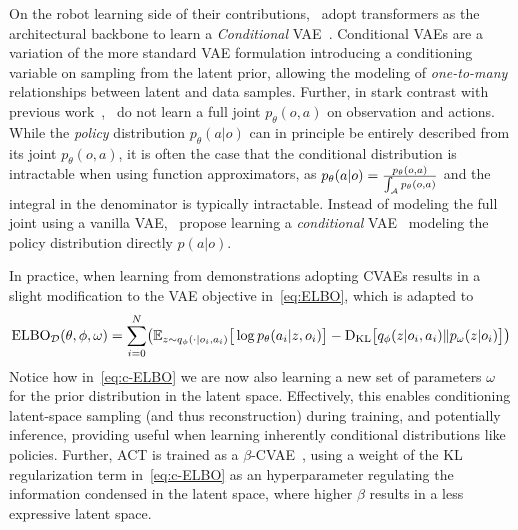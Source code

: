 On the robot learning side of their contributions,~\citet{zhaoLearningFineGrainedBimanual2023} adopt transformers as the architectural backbone to learn a \emph{Conditional} VAE~\citep{sohnLearningStructuredOutput2015}. 
Conditional VAEs are a variation of the more standard VAE formulation introducing a conditioning variable on sampling from the latent prior, allowing the modeling of \emph{one-to-many} relationships between latent and data samples.
Further, in stark contrast with previous work~\citep{florenceImplicitBehavioralCloning2022,jannerPlanningDiffusionFlexible2022},~\citet{zhaoLearningFineGrainedBimanual2023} do not learn a full joint \( p_\theta(o,a) \) on observation and actions.
While the \emph{policy} distribution \( p_\theta(a \vert o) \) can in principle be entirely described from its joint \( p_\theta(o,a) \), it is often the case that the conditional distribution is intractable when using function approximators, as \( p_\theta(a \vert o) = \tfrac{p_\theta(o,a)}{\int_\mathcal A p_\theta(o,a)} \) and the integral in the denominator is typically intractable.
Instead of modeling the full joint using a vanilla VAE,~\citet{zhaoLearningFineGrainedBimanual2023} propose learning a \emph{conditional} VAE~\citep{sohnLearningStructuredOutput2015} modeling the policy distribution directly \( p (a \vert o) \).

In practice, when learning from demonstrations adopting CVAEs results in a slight modification to the VAE objective in~\ref{eq:ELBO}, which is adapted to
\begin{align}\label{eq:c-ELBO}
    \text{ELBO}_{\mathcal D}(\theta, \phi, \omega) = \sum_{i=0}^{N} \left(
            \mathbb{E}_{z \sim q_\phi(\cdot \vert o_i, a_i)} \big[ \log p_\theta(a_i \vert z, o_i) \big]
        - \DKL \big[ q_\phi(z \vert o_i, a_i) \Vert p_\omega(z \vert o_i) \big]
        \right)
\end{align}
Notice how in~\ref{eq:c-ELBO} we are now also learning a new set of parameters \( \omega \) for the prior distribution in the latent space.
Effectively, this enables conditioning latent-space sampling (and thus reconstruction) during training, and potentially inference, providing useful when learning inherently conditional distributions like policies.
Further, ACT is trained as a \( \beta\)-CVAE~\citep{higgins2017beta}, using a weight of the KL regularization term in~\ref{eq:c-ELBO} as an hyperparameter regulating the information condensed in the latent space, where higher \( \beta \) results in a less expressive latent space.

